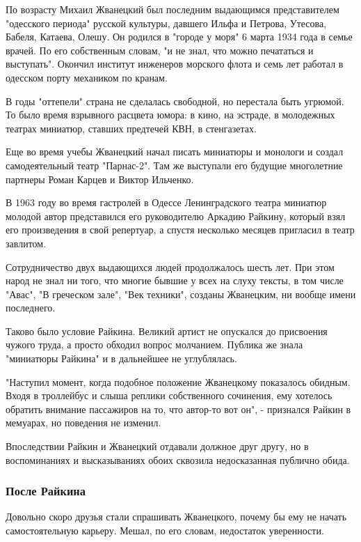 По возрасту Михаил Жванецкий был последним выдающимся представителем
"одесского периода" русской культуры, давшего Ильфа и Петрова, Утесова,
Бабеля, Катаева, Олешу. Он родился в "городе у моря" 6 марта 1934 года в
семье врачей. По его собственным словам, "и не знал, что можно печататься
и выступать". Окончил институт инженеров морского флота и семь лет работал
в одесском порту механиком по кранам.

В годы "оттепели" страна не сделалась свободной, но перестала быть
угрюмой. То было время взрывного расцвета юмора: в кино, на эстраде, в
молодежных театрах миниатюр, ставших предтечей КВН, в стенгазетах.

Еще во время учебы Жванецкий начал писать миниатюры и монологи и создал
самодеятельный театр "Парнас-2". Там же выступали его будущие многолетние
партнеры Роман Карцев и Виктор Ильченко.

В 1963 году во время гастролей в Одессе Ленинградского театра миниатюр
молодой автор представился его руководителю Аркадию Райкину, который взял
его произведения в свой репертуар, а спустя несколько месяцев пригласил в
театр завлитом.

Сотрудничество двух выдающихся людей продолжалось шесть лет. При этом
народ не знал ни того, что многие бывшие у всех на слуху тексты, в том
числе "Авас", "В греческом зале", "Век техники", созданы Жванецким, ни
вообще имени последнего.

Таково было условие Райкина. Великий артист не опускался до присвоения
чужого труда, а просто обходил вопрос молчанием. Публика же знала
"миниатюры Райкина" и в дальнейшее не углублялась.

"Наступил момент, когда подобное положение Жванецкому показалось обидным.
Входя в троллейбус и слыша реплики собственного сочинения, ему хотелось
обратить внимание пассажиров на то, что автор-то вот он", - признался
Райкин в мемуарах, но поведения не изменил.

Впоследствии Райкин и Жванецкий отдавали должное друг другу, но в
воспоминаниях и высказываниях обоих сквозила недосказанная публично обида.

\subsubsection{После Райкина}

Довольно скоро друзья стали спрашивать Жванецкого, почему бы ему не начать
самостоятельную карьеру. Мешал, по его словам, недостаток уверенности.

